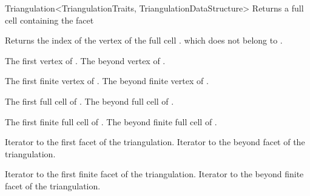 \begin{ccRefClass}{Triangulation<TriangulationTraits, TriangulationDataStructure>}
{Returns a full cell containing the facet }

{Returns the index of the vertex of the full cell
\ccVar. which does {not} belong to .}


{}
{The first vertex of \ccVar.}
\ccGlue{}
{The beyond vertex of \ccVar.}

{}
{The first finite vertex of \ccVar.}
\ccGlue{}
{The beyond finite vertex of \ccVar.}

{}
{The first full cell of \ccVar.}
\ccGlue{}
{The beyond full cell of \ccVar.}

{}
{The first finite full cell of \ccVar.}
\ccGlue{}
{The beyond finite full cell of \ccVar.}

{Iterator to the first facet of the triangulation.}
\ccGlue
{}
{Iterator to the beyond facet of the triangulation.}

{Iterator to the first finite facet of the triangulation.}
\ccGlue
{}
{Iterator to the beyond finite facet of the triangulation.}



\end{ccRefClass}
